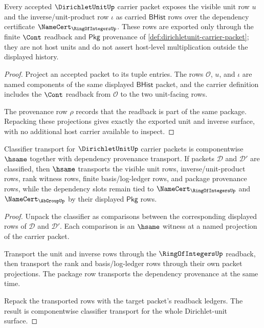 \begin{theorem}
\label{thm:dirichletunit-visible-unit-row-obligation}
Every accepted $\DirichletUnitUp$ carrier packet exposes the visible unit row $u$ and the inverse/unit-product row $\iota$ as carried $\mathsf{BHist}$ rows over the dependency certificate $\NameCert_{\RingOfIntegersUp}$. These rows are exported only through the finite $\Cont$ readback and $\mathsf{Pkg}$ provenance of \autoref{def:dirichletunit-carrier-packet}; they are not host units and do not assert host-level multiplication outside the displayed history.
\end{theorem}
\begin{proof}
Project an accepted packet to its tuple entries. The rows $\mathcal{O}$, $u$, and $\iota$ are named components of the same displayed $\mathsf{BHist}$ packet, and the carrier definition includes the $\Cont$ readback from $\mathcal{O}$ to the two unit-facing rows.

The provenance row $\rho$ records that the readback is part of the same package. Repacking these projections gives exactly the exported unit and inverse surface, with no additional host carrier available to inspect.
\end{proof}

\begin{theorem}
\label{thm:dirichletunit-classifier-obligation}
Classifier transport for $\DirichletUnitUp$ carrier packets is componentwise $\hsame$ together with dependency provenance transport. If packets $\mathcal{D}$ and $\mathcal{D}'$ are classified, then $\hsame$ transports the visible unit rows, inverse/unit-product rows, rank witness rows, finite basis/log-ledger rows, and package provenance rows, while the dependency slots remain tied to $\NameCert_{\RingOfIntegersUp}$ and $\NameCert_{\AbGroupUp}$ by their displayed $\mathsf{Pkg}$ rows.
\end{theorem}
\begin{proof}
Unpack the classifier as comparisons between the corresponding displayed rows of $\mathcal{D}$ and $\mathcal{D}'$. Each comparison is an $\hsame$ witness at a named projection of the carrier packet.

Transport the unit and inverse rows through the $\RingOfIntegersUp$ readback, then transport the rank and basis/log-ledger rows through their own packet projections. The package row transports the dependency provenance at the same time.

Repack the transported rows with the target packet's readback ledgers. The result is componentwise classifier transport for the whole Dirichlet-unit surface.
\end{proof}

